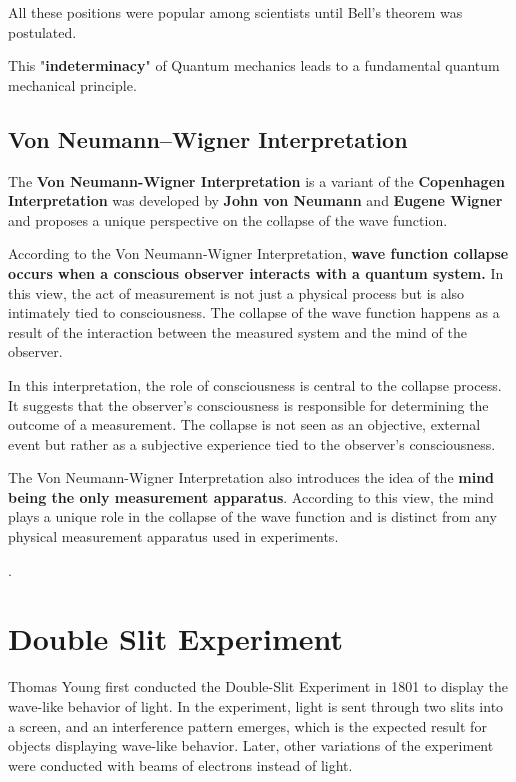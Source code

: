 \documentclass{article}
\begin{document}
All these positions were popular among scientists until Bell's theorem was postulated.


This "\textbf{indeterminacy}" of Quantum mechanics leads to a fundamental quantum mechanical principle.


\subsection{\Large Von Neumann–Wigner Interpretation}

The \textbf{Von Neumann-Wigner Interpretation} is a variant of the \textbf{Copenhagen Interpretation} was developed by \textbf{John von Neumann} and \textbf{Eugene Wigner} and proposes a unique perspective on the collapse of the wave function.

According to the Von Neumann-Wigner Interpretation, \textbf{wave function collapse occurs when a conscious observer interacts with a quantum system.} In this view, the act of measurement is not just a physical process but is also intimately tied to consciousness. The collapse of the wave function happens as a result of the interaction between the measured system and the mind of the observer.

In this interpretation, the role of consciousness is central to the collapse process. It suggests that the observer's consciousness is responsible for determining the outcome of a measurement. The collapse is not seen as an objective, external event but rather as a subjective experience tied to the observer's consciousness.

The Von Neumann-Wigner Interpretation also introduces the idea of the \textbf{mind being the only measurement apparatus}. According to this view, the mind plays a unique role in the collapse of the wave function and is distinct from any physical measurement apparatus used in experiments.

.

\section{\Large Double Slit Experiment}
Thomas Young first conducted the Double-Slit Experiment in 1801 to display the wave-like behavior of light. In
the experiment, light is sent through two slits into a screen,
and an interference pattern emerges, which is the expected
result for objects displaying wave-like behavior. Later, other
variations of the experiment were conducted with beams of
electrons instead of light.
\end{document}

